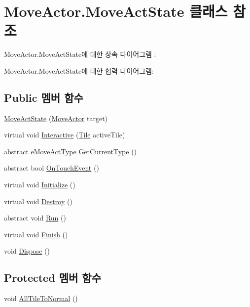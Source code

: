 \hypertarget{class_move_actor_1_1_move_act_state}{}\section{Move\+Actor.\+Move\+Act\+State 클래스 참조}
\label{class_move_actor_1_1_move_act_state}


Move\+Actor.\+Move\+Act\+State에 대한 상속 다이어그램 \+: 


Move\+Actor.\+Move\+Act\+State에 대한 협력 다이어그램\+:
\subsection*{Public 멤버 함수}
\begin{DoxyCompactItemize}
\item 
\hyperlink{class_move_actor_1_1_move_act_state_a3b5151984b49ac01bce197ec80e299b1}{Move\+Act\+State} (\hyperlink{class_move_actor}{Move\+Actor} target)
\item 
virtual void \hyperlink{class_move_actor_1_1_move_act_state_ae43bc38159d36bd83eaf172d946c0415}{Interactive} (\hyperlink{class_tile}{Tile} active\+Tile)
\item 
abstract \hyperlink{_move_actor_8cs_a1df5a2532cc7e6bde40a57d2dcbe23fe}{e\+Move\+Act\+Type} \hyperlink{class_move_actor_1_1_move_act_state_a21d1c989ddf24ff492600353ed8e7682}{Get\+Current\+Type} ()
\item 
abstract bool \hyperlink{class_move_actor_1_1_move_act_state_a5f459cc7bafbc01d915e5bdb01d9f715}{On\+Touch\+Event} ()
\item 
virtual void \hyperlink{class_m_c_n_1_1_state_a8eabaffe047e6dccd5c5d8aed7bf218a}{Initialize} ()
\item 
virtual void \hyperlink{class_m_c_n_1_1_state_a32af22a6a0a979d3b3a80225426aa839}{Destroy} ()
\item 
abstract void \hyperlink{class_m_c_n_1_1_state_a8adfea67c55997e5c0eefbae1e429f4d}{Run} ()
\item 
virtual void \hyperlink{class_m_c_n_1_1_state_a6de4f94b23916fcd05f589759da9ac3f}{Finish} ()
\item 
void \hyperlink{class_m_c_n_1_1_state_a6c53b2eda47e718ff469fd76a95cf02a}{Dispose} ()
\end{DoxyCompactItemize}
\subsection*{Protected 멤버 함수}
\begin{DoxyCompactItemize}
\item 
void \hyperlink{class_move_actor_1_1_move_act_state_a8e1d5e7942d4f9de8c8e0732964c554b}{All\+Tile\+To\+Normal} ()
\end{DoxyCompactItemize}
